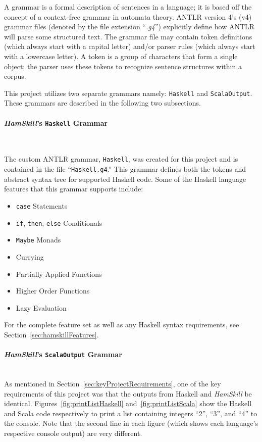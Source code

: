 \documentclass{report}
\newcommand{\myparagraph}[1]{\paragraph{#1}\mbox{}\\}
\begin{document}
A grammar is a formal description of sentences in a language; it is based off the concept of a context-free grammar in automata theory.  ANTLR version 4's (v4) grammar files (denoted by the file extension ``\emph{.g4}'') explicitly define how ANTLR will parse some structured text.  The grammar file may contain token definitions (which always start with a capital letter) and/or parser rules (which always start with a lowercase letter).  A token is a group of characters that form a single object; the parser uses these tokens to recognize sentence structures within a corpus.

This project utilizes two separate grammars namely: \texttt{Haskell} and \texttt{ScalaOutput}.  These grammars are described in the following two subsections.

\myparagraph{\textit{HamSkill}'s \texttt{Haskell} Grammar}\label{sec:haskellG4}

The custom ANTLR grammar, \texttt{Haskell}, was created for this project and is contained in the file ``\texttt{Haskell.g4}.''  This grammar defines both the tokens and abstract syntax tree for supported Haskell code.  Some of the Haskell language features that this grammar supports include:

\begin{itemize}
   \item \texttt{case} Statements
   \item \texttt{if}, \texttt{then}, \texttt{else} Conditionals
   \item \texttt{Maybe} Monads
   \item Currying
   \item Partially Applied Functions
   \item Higher Order Functions
   \item Lazy Evaluation
\end{itemize}

For the complete feature set as well as any Haskell syntax requirements, see Section~\ref{sec:hamskillFeatures}.

\myparagraph{\textit{HamSkill}'s \texttt{ScalaOutput} Grammar} 

As mentioned in Section~\ref{sec:keyProjectRequirements}, one of the key requirements of this project was that the outputs from Haskell and \textit{HamSkill} be identical.  Figures~\ref{fig:printListHaskell} and~\ref{fig:printListScala} show the Haskell and Scala code respectively to print a list containing integers ``2'', ``3'', and ``4'' to the console.  Note that the second line in each figure (which shows each language's respective console output) are very different.
\end{document}
